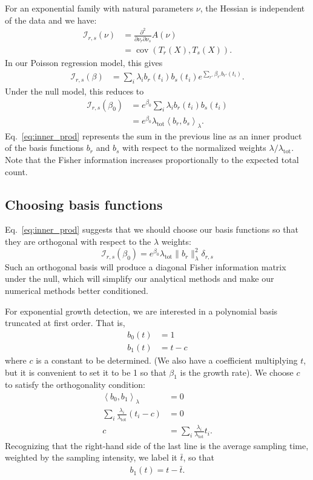 \documentclass[12pt, letterpaper]{article}
\newcommand{ \lambtot }{\lambda_{\text{tot}}}
\DeclareMathOperator{\cov}{cov}
\begin{document}
For an exponential family with natural parameters $\nu$, the Hessian is independent of the data and we have:
\begin{align}
    \mathcal{I}_{r,s}(\nu) &= \frac{\partial^2}{\partial \nu_r \partial \nu_s} A(\nu)\\
                           &= \cov\left(T_r(X), T_s(X)\right).
\end{align}
In our Poisson regression model, this gives
\begin{align}
    \mathcal{I}_{r,s}(\beta) &= \sum_i \lambda_i b_r(t_i) b_s(t_i) e^{\sum_{r'} \beta_{r'} b_{r'}(t_i)}.
    \label{eq:fisher_info}
\end{align}
Under the null model, this reduces to
\begin{align}
    \mathcal{I}_{r,s}(\beta_0) &= e^{\beta_0} \sum_i \lambda_i b_r(t_i) b_s(t_i) \\
                               &= e^{\beta_0} \lambtot \left< b_r, b_s \right>_\lambda. \label{eq:inner_prod}
\end{align}
Eq.~\ref{eq:inner_prod} represents the sum in the previous line as an inner product of the basis functions $b_r$ and $b_s$ with respect to the normalized weights $\lambda / \lambtot$.
Note that the Fisher information increases proportionally to the expected total count.

\subsection{Choosing basis functions}

Eq.~\ref{eq:inner_prod} suggests that we should choose our basis functions so that they are orthogonal with respect to the $\lambda$ weights:
\begin{equation}
    \mathcal{I}_{r,s}(\beta_0) = e^{\beta_0} \lambtot \| b_r \|_{\lambda}^2 \delta_{r,s}
    \label{eq:i_ortho}
\end{equation}
Such an orthogonal basis will produce a diagonal Fisher information matrix under the null, which will simplify our analytical methods and make our numerical methods better conditioned.

For exponential growth detection, we are interested in a polynomial basis truncated at first order.
That is,
\begin{align}
    b_0(t) &= 1 \\
    b_1(t) &= t - c
\end{align}
where $c$ is a constant to be determined.
(We also have a coefficient multiplying $t$, but it is convenient to set it to be 1 so that $\beta_1$ is the growth rate).
We choose $c$ to satisfy the orthogonality condition:
\begin{align}
    \left<b_0, b_1\right>_\lambda &= 0 \\
    \sum_i \frac{\lambda_i}{\lambtot} (t_i - c) &= 0 \\
    c &= \sum_i \frac{\lambda_i}{\lambtot} t_i.
\end{align}
Recognizing that the right-hand side of the last line is the average sampling time, weighted by the sampling intensity, we label it $\bar{t}$, so that
\begin{align}
    b_1(t) = t - \bar{t}.
\end{align}
\end{document}
